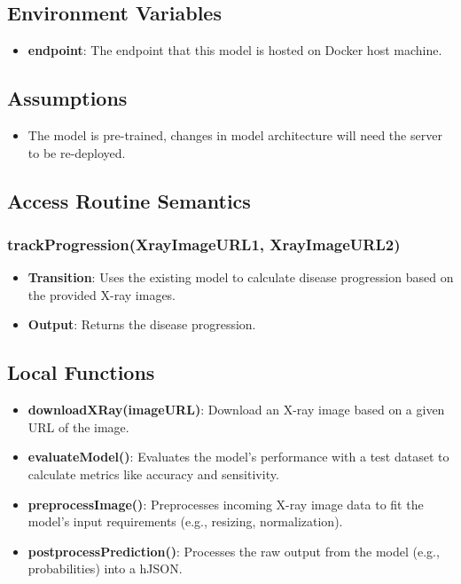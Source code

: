 \documentclass[12pt, titlepage]{article}
\begin{document}
\subsection{Environment Variables}
\begin{itemize}
    \item \textbf{endpoint}: The endpoint that this model is hosted on Docker host machine.
\end{itemize}

\subsection{Assumptions}
\begin{itemize}
    \item The model is pre-trained, changes in model architecture will need the server to be re-deployed.
\end{itemize}

\subsection{Access Routine Semantics}
\subsubsection{trackProgression(XrayImageURL1, XrayImageURL2)}
\begin{itemize}
    \item \textbf{Transition}: Uses the existing model to calculate disease progression based on the provided X-ray images.
    \item \textbf{Output}: Returns the disease progression.
\end{itemize}

\subsection{Local Functions}
\begin{itemize}
    \item \textbf{downloadXRay(imageURL)}: Download an X-ray image based on a given URL of the image.
    \item \textbf{evaluateModel()}: Evaluates the model’s performance with a test dataset to calculate metrics like accuracy and sensitivity.
    \item \textbf{preprocessImage()}: Preprocesses incoming X-ray image data to fit the model's input requirements (e.g., resizing, normalization).
    \item \textbf{postprocessPrediction()}: Processes the raw output from the model (e.g., probabilities) into a hJSON.
\end{itemize}
\end{document}
